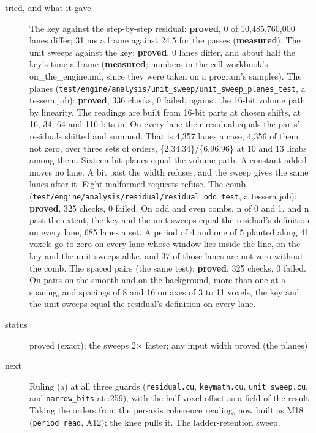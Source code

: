 \begin{description}
\item[{tried, and what it gave}] The key against the step-by-step residual: \textbf{proved}, 0 of 10,485,760,000 lanes differ; 31 ms a frame against 24.5 for the passes (\textbf{measured}). The unit sweeps against the key: \textbf{proved}, 0 lanes differ, and about half the key's time a frame (\textbf{measured}; numbers in the cell workbook's on\_\allowbreak{}the\_\allowbreak{}engine.md, since they were taken on a program's samples). The planes (\texttt{test/\allowbreak{}engine/\allowbreak{}analysis/\allowbreak{}unit\_\allowbreak{}sweep/\allowbreak{}unit\_\allowbreak{}sweep\_\allowbreak{}planes\_\allowbreak{}test}, a tessera job): \textbf{proved}, 336 checks, 0 failed, against the 16-bit volume path by linearity. The readings are built from 16-bit parts at chosen shifts, at 16, 34, 64 and 116 bits in. On every lane their residual equals the parts' residuals shifted and summed. That is 4,357 lanes a case, 4,356 of them not zero, over three sets of orders, \{2,34,34\}/\{6,96,96\} at 10 and 13 limbs among them. Sixteen-bit planes equal the volume path. A constant added moves no lane. A bit past the width refuses, and the sweep gives the same lanes after it. Eight malformed requests refuse. The comb (\texttt{test/\allowbreak{}engine/\allowbreak{}analysis/\allowbreak{}residual/\allowbreak{}residual\_\allowbreak{}odd\_\allowbreak{}test}, a tessera job): \textbf{proved}, 325 checks, 0 failed. On odd and even combs, n of 0 and 1, and n past the extent, the key and the unit sweeps equal the residual's definition on every lane, 685 lanes a set. A period of 4 and one of 5 planted along 41 voxels go to zero on every lane whose window lies inside the line, on the key and the unit sweeps alike, and 37 of those lanes are not zero without the comb. The spaced pairs (the same test): \textbf{proved}, 325 checks, 0 failed. On pairs on the smooth and on the background, more than one at a spacing, and spacings of 8 and 16 on axes of 3 to 11 voxels, the key and the unit sweeps equal the residual's definition on every lane.
\item[{status}] proved (exact); the sweeps 2× faster; any input width proved (the planes)
\item[{next}] Ruling (a) at all three guards (\texttt{residual.\allowbreak{}cu}, \texttt{keymath.\allowbreak{}cu}, \texttt{unit\_\allowbreak{}sweep.\allowbreak{}cu}, and \texttt{narrow\_\allowbreak{}bits} at :259), with the half-voxel offset as a field of the result. Taking the orders from the per-axis coherence reading, now built as M18 (\texttt{period\_\allowbreak{}read}, A12); the knee pulls it. The ladder-retention sweep.
\end{description}


